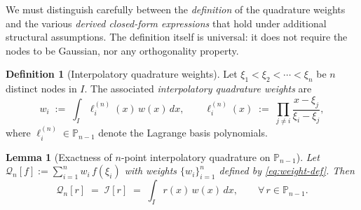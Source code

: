 \documentclass[11pt,a4paper]{article}
\newtheorem{lemma}[theorem]{Lemma}
\theoremstyle{definition}
\newtheorem{definition}[theorem]{Definition}
\newcommand{\PP}{\mathbb{P}}
\newcommand{\I}{\mathcal{I}}
\newcommand{\Q}{\mathcal{Q}}
\begin{document}
We must distinguish carefully between the \emph{definition} of the quadrature
weights and the various \emph{derived closed-form expressions} that hold under
additional structural assumptions. The definition itself is universal: it does
not require the nodes to be Gaussian, nor any orthogonality property.

\begin{definition}[Interpolatory quadrature weights]\label{def:weights}
Let $\xi_1<\xi_2<\cdots<\xi_n$ be $n$ distinct nodes in $I$. The associated
\emph{interpolatory quadrature weights} are
\begin{equation}
  w_i \;:=\; \int_I \ell_i^{(n)}(x)\,w(x)\,dx,
  \qquad
  \ell_i^{(n)}(x) \;:=\; \prod_{j\neq i}\frac{x-\xi_j}{\xi_i-\xi_j},
  \label{eq:weight-def}
\end{equation}
where $\ell_i^{(n)}\in\PP_{n-1}$ denote the Lagrange basis polynomials.
\end{definition}

\begin{lemma}[Exactness of $n$-point interpolatory quadrature on
$\PP_{n-1}$]\label{lem:interp-exact}
Let $\Q_n[f]:=\sum_{i=1}^n w_i\,f(\xi_i)$ with weights $\{w_i\}_{i=1}^n$
defined by \eqref{eq:weight-def}. Then
\[
  \Q_n[r] \;=\; \I[r] \;=\; \int_I r(x)\,w(x)\,dx,
  \qquad \forall\, r\in\PP_{n-1}.
\]
\end{lemma}
\end{document}
